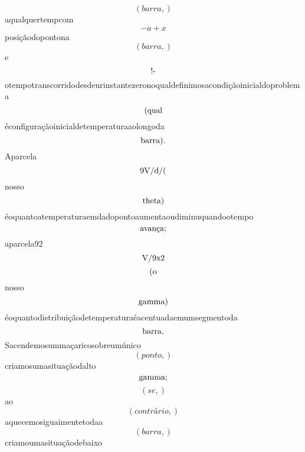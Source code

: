 \documentclass{article}
\begin{document}
\begin{equation}
\left( barra,\right)
\end{equation}aqualquertempcom\begin{equation}
- a + x
\end{equation}posiçãodopontona\begin{equation}
\left( barra,\right)
\end{equation}e\begin{equation}
$!-$
\end{equation}otempotranscorridodesdeurinstantezeronoqualdefinimosacondiçãoinicialdoproblema\begin{equation}
$(qual$
\end{equation}éconfiguraçãoinicialdetemperaturaaolongoda\begin{equation}
$barra).$
\end{equation}Aparcela\begin{equation}
$9V/d/($
\end{equation}nosso\begin{equation}
$theta)$
\end{equation}éoquantoatemperaturaemdadopontoaumentaoudiminuquandootempo\begin{equation}
$avança;$
\end{equation}aparcela92\begin{equation}
$V/9x2$
\end{equation}\begin{equation}
$(o$
\end{equation}nosso\begin{equation}
$gamma)$
\end{equation}éoquantodistribuiçãodetemperaturaéacentuadaemumsegmentoda\begin{equation}
$barra.$
\end{equation}Sacendemosummaçaricosobreumúnico\begin{equation}
\left( ponto,\right)
\end{equation}criamosumasituaçãodalto\begin{equation}
$gamma;$
\end{equation}\begin{equation}
\left( se,\right)
\end{equation}ao\begin{equation}
\left( contrário,\right)
\end{equation}aquecemosiguaimentetodaa\begin{equation}
\left( barra,\right)
\end{equation}criamoumasituaçãodebaixo\begin{equation}

\end{equation}
\end{document}

